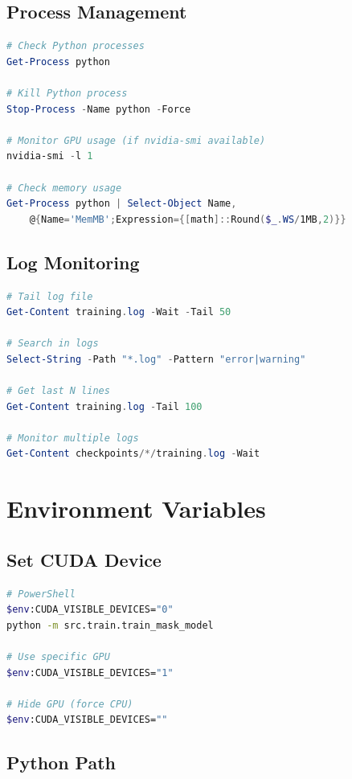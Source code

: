\documentclass[12pt,a4paper]{article}
\begin{document}
\subsection{Process Management}

\begin{lstlisting}[language=powershell]
# Check Python processes
Get-Process python

# Kill Python process
Stop-Process -Name python -Force

# Monitor GPU usage (if nvidia-smi available)
nvidia-smi -l 1

# Check memory usage
Get-Process python | Select-Object Name, 
    @{Name='MemMB';Expression={[math]::Round($_.WS/1MB,2)}}
\end{lstlisting}

\subsection{Log Monitoring}

\begin{lstlisting}[language=powershell]
# Tail log file
Get-Content training.log -Wait -Tail 50

# Search in logs
Select-String -Path "*.log" -Pattern "error|warning"

# Get last N lines
Get-Content training.log -Tail 100

# Monitor multiple logs
Get-Content checkpoints/*/training.log -Wait
\end{lstlisting}

\section{Environment Variables}

\subsection{Set CUDA Device}

\begin{lstlisting}[language=bash]
# PowerShell
$env:CUDA_VISIBLE_DEVICES="0"
python -m src.train.train_mask_model

# Use specific GPU
$env:CUDA_VISIBLE_DEVICES="1"

# Hide GPU (force CPU)
$env:CUDA_VISIBLE_DEVICES=""
\end{lstlisting}

\subsection{Python Path}
\end{document}
